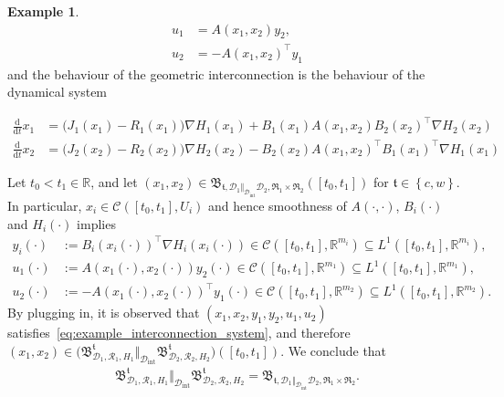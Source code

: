 \documentclass[preprint,12pt]{elsarticle}
\theoremstyle{definition}
\newtheorem{example}[theorem]{Example}
\newcommand{\set}[1]{\left\lbrace #1\right\rbrace}
\begin{document}
\begin{example}
\begin{equation}
\begin{aligned}
u_1 & = A(x_1,x_2)y_2,\\
u_2 & = -A(x_1,x_2)^\top y_1
\end{aligned}
\end{equation}
and the behaviour of the geometric interconnection is the behaviour of the dynamical system
\begin{small}
\begin{equation}
\begin{aligned}
\tfrac{\mathrm{d}}{\mathrm{d}t}x_1 & = \big(J_1(x_1)-R_1(x_1)\big)\nabla H_1(x_1) +  B_1(x_1)A(x_1,x_2)B_2(x_2)^\top\nabla H_2(x_2)\\
\tfrac{\mathrm{d}}{\mathrm{d}t}x_2 & = \big(J_2(x_2)-R_2(x_2)\big)\nabla H_2(x_2) - B_2(x_2)A(x_1,x_2)^\top B_1(x_1)^\top\nabla H_1(x_1)
\end{aligned}
\end{equation}
\end{small}
Let $t_0<t_1\in\mathbb{R}$, and let $(x_1,x_2)\in\mathfrak{B}_{\mathfrak{t},\mathcal{D}_1\Vert_{\mathcal{D}_{\mathrm{int}}}\mathcal{D}_2,\mathfrak{R}_1\times\mathfrak{R}_2}([t_0,t_1])$ for $\mathfrak{t}\in\set{c,w}$. In particular, $x_i\in\mathcal{C}([t_0,t_1],U_i)$ and hence smoothness of $A(\cdot,\cdot)$, $B_i(\cdot)$ and $H_i(\cdot)$ implies 
\begin{align*}
y_i(\cdot) & := B_i(x_i(\cdot))^\top\nabla H_i(x_i(\cdot))\in\mathcal{C}([t_0,t_1],\mathbb{R}^{m_i})\subseteq L^1([t_0,t_1],\mathbb{R}^{m_i}),\\
u_1(\cdot) & := A(x_1(\cdot),x_2(\cdot))y_2(\cdot)\in\mathcal{C}([t_0,t_1],\mathbb{R}^{m_1})\subseteq L^1([t_0,t_1],\mathbb{R}^{m_1}),\\
u_2(\cdot) & := -A(x_1(\cdot),x_2(\cdot))^\top y_1(\cdot)\in\mathcal{C}([t_0,t_1],\mathbb{R}^{m_2})\subseteq L^1([t_0,t_1],\mathbb{R}^{m_2}).
\end{align*}
By plugging in, it is observed that $(x_1,x_2,y_1,y_2,u_1,u_2)$ satisfies~\eqref{eq:example_interconnection_system}, and therefore $(x_1,x_2)\in\big(\mathfrak{B}^{\mathfrak{t}}_{\mathcal{D}_1,\mathcal{R}_1,H_1}\Vert_{\mathcal{D}_{\mathrm{int}}}\mathfrak{B}^{\mathfrak{t}}_{\mathcal{D}_2,\mathcal{R}_2,H_2}\big)([t_0,t_1])$. We conclude that
\begin{align*}
\mathfrak{B}^{\mathfrak{t}}_{\mathcal{D}_1,\mathcal{R}_1,H_1}\Vert_{\mathcal{D}_{\mathrm{int}}}\mathfrak{B}^{\mathfrak{t}}_{\mathcal{D}_2,\mathcal{R}_2,H_2} = \mathfrak{B}_{\mathfrak{t},\mathcal{D}_1\Vert_{\mathcal{D}_{\mathrm{int}}}\mathcal{D}_2,\mathfrak{R}_1\times\mathfrak{R}_2}.
\end{align*}
\end{example}
\end{document}
